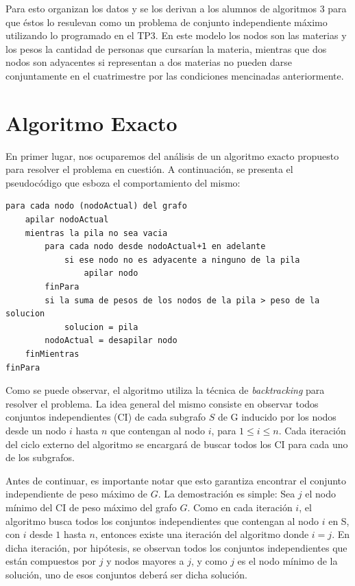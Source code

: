 \documentclass[a4paper,11pt] {article}
\begin{document}
Para esto organizan los datos y se los derivan a los alumnos de algoritmos 3 para que éstos lo resulevan como un problema de conjunto independiente máximo utilizando lo programado en el TP3.
En este modelo los nodos son las materias y los pesos la cantidad de personas que cursarían la materia, mientras que dos nodos son adyacentes si representan a dos materias no pueden darse conjuntamente en el cuatrimestre por las condiciones mencinadas anteriormente.

\bigskip
\section{Algoritmo Exacto}

En primer lugar, nos ocuparemos del análisis de un algoritmo exacto propuesto para resolver el problema en cuestión. A continuación, se presenta el pseudocódigo que esboza el comportamiento del mismo:

\begin{verbatim}
para cada nodo (nodoActual) del grafo
    apilar nodoActual
    mientras la pila no sea vacia
        para cada nodo desde nodoActual+1 en adelante
            si ese nodo no es adyacente a ninguno de la pila
                apilar nodo
        finPara
        si la suma de pesos de los nodos de la pila > peso de la solucion
            solucion = pila
        nodoActual = desapilar nodo
    finMientras
finPara
\end{verbatim}

Como se puede observar, el algoritmo utiliza la técnica de \textit{backtracking} para resolver el problema. La idea general del mismo consiste en observar todos conjuntos independientes (CI) de cada subgrafo $S$ de G inducido por los nodos desde un nodo $i$ hasta $n$ que contengan al nodo $i$, para $1 \leq i \leq n$\footnotemark[1]. Cada iteración del ciclo externo del algoritmo se encargará de buscar todos los CI para cada uno de los subgrafos.

Antes de continuar, es importante notar que esto garantiza encontrar el conjunto independiente de peso máximo de $G$. La demostración es simple: Sea $j$ el nodo mínimo del CI de peso máximo del grafo $G$. Como en cada iteración $i$, el algoritmo busca todos los conjuntos independientes que contengan al nodo $i$ en S, con $i$ desde $1$ hasta $n$, entonces existe una iteración del algoritmo donde $i = j$. En dicha iteración, por hipótesis, se observan todos los conjuntos independientes que están compuestos por $j$ y nodos mayores a $j$, y como $j$ es el nodo mínimo de la solución, uno de esos conjuntos deberá ser dicha solución.
\end{document}
